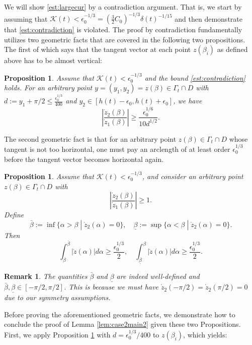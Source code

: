 \documentclass[11pt]{article}
\numberwithin{equation}{section}
\newtheorem{prop}[thm]{Proposition}
\newtheorem{rmk}[thm]{Remark}
\newcommand{\eps}{\epsilon}
\newcommand{\calK}{\mathcal{K}}
\newcommand{\dotz}{\dot{z}}
\begin{document}
We will show \eqref{est:largecur} by a contradiction argument. That is, we start by assuming that $\calK(t) < \eps_0^{-1/3} = \left(\frac{3}{2}C_0\right)^{-1/3}\delta(t)^{-1/15}$ and then demonstrate that \eqref{est:contradiction} is violated. The proof by contradiction fundamentally utilizes two geometric facts that are covered in the following two propositions. The first of which says that the tangent vector at each point $z(\beta_i)$ as defined above has to be almost vertical:
\begin{prop}
    \label{prop:largeslope}
    Assume that $\calK(t) < \eps_0^{-1/3}$ and the bound \eqref{est:contradiction} holds. For an arbitrary point $y = (y_1, y_2) = z(\beta) \in \Gamma_t \cap D$ with $d := y_1 + \pi/2 \le \frac{\eps_0^{1/3}}{400}$ and $y_2 \in [h(t) - \eps_0, h(t) + \eps_0]$, we have
    \begin{equation}
        \label{est:largeslope}
        \left|\frac{\dotz_2(\beta)}{\dotz_1(\beta)}\right| \ge \frac{\eps_0^{1/6}}{10d^{1/2}}.
    \end{equation}
\end{prop}
The second geometric fact is that for an arbitrary point $z(\beta) \in \Gamma_t \cap D$ whose tangent is not too horizontal, one must pay an arclength of at least order $\eps_0^{1/3}$ before the tangent vector becomes horizontal again.
\begin{prop}\label{prop:budget}
    Assume that $\calK(t) < \eps_0^{-1/3}$, and consider an arbitrary point $z(\beta) \in \Gamma_t\cap D$ with
    $$
    \left|\frac{\dotz_2(\beta)}{\dotz_1(\beta)}\right| \ge 1.
    $$
    Define
    $$
    \bar{\beta} := \inf\{\alpha > \beta\;|\; \dotz_2(\alpha) = 0\},\quad \underline{\beta} := \sup\{\alpha < \beta\;|\; \dotz_2(\alpha) = 0\}.
    $$
    Then
    $$
    \int_\beta^{\bar{\beta}} |\dotz(\alpha)| d\alpha \ge \frac{\eps_0^{1/3}}{2},\quad \int^\beta_{\underline{\beta}} |\dotz(\alpha)| d\alpha \ge \frac{\eps_0^{1/3}}{2}.
    $$
\end{prop}
\begin{rmk}
    The quantities $\bar\beta$ and $\underline{\beta}$ are indeed well-defined and $\bar\beta, \underline{\beta} \in [-\pi/2,\pi/2]$. This is because we must have $\dot{z}_2(-\pi/2) = \dot{z}_2(\pi/2) = 0$ due to our symmetry assumptions.
\end{rmk}
Before proving the aforementioned geometric facts, we demonstrate how to conclude the proof of Lemma \ref{lem:case2main2} given these two Propositions. First, we apply Proposition \ref{prop:largeslope} with $d = \eps_0^{1/3}/400$ to $z(\beta_i)$, which yields:
\end{document}
